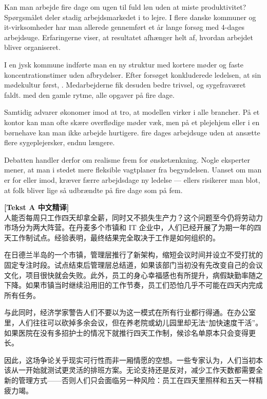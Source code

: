 Kan man arbejde fire dage om ugen til fuld løn uden at miste produktivitet? Spørgsmålet deler stadig arbejdsmarkedet i to lejre. I flere danske kommuner og it-virksomheder har man allerede gennemført et år lange forsøg med 4-dages arbejdsuge. Erfaringerne viser, at resultatet afhænger helt af, hvordan arbejdet bliver organiseret.

I en jysk kommune indførte man en ny struktur med kortere møder og faste koncentrationstimer uden afbrydelser. Efter forsøget konkluderede ledelsen, at  sin mødekultur først, . Medarbejderne fik desuden bedre trivsel, og sygefraværet faldt.  med den gamle rytme,  alle opgaver på fire dage.

Samtidig advarer økonomer imod at tro, at modellen virker i alle brancher. På et kontor kan man ofte skære overflødige møder væk, men på et plejehjem eller i en børnehave kan man ikke arbejde hurtigere.  fire dages arbejdsuge uden at ansætte flere sygeplejersker,  endnu længere.

Debatten handler derfor om realisme frem for ønsketænkning. Nogle eksperter mener, at man i stedet  mere fleksible vagtplaner fra begyndelsen. Uanset om man er for eller imod, kræver færre arbejdsdage ny ledelse --- ellers risikerer man blot, at folk bliver lige så udbrændte på fire dage som på fem.

\begin{transbox}
\small
\textbf{\color{NCDTeal}[Tekst A 中文精译]}\\
人能否每周只工作四天却拿全薪，同时又不损失生产力？这个问题至今仍将劳动力市场分为两大阵营。在丹麦多个市镇和 IT 企业中，人们已经开展了为期一年的四天工作制试点。经验表明，最终结果完全取决于工作是如何组织的。

在日德兰半岛的一个市镇，管理层推行了新架构，缩短会议时间并设立不受打扰的固定专注时段。试点结束后管理层总结道，如果该部门当初没有先改变自己的会议文化，项目很快就会失败。此外，员工的身心幸福感也有所提升，病假缺勤率随之下降。如果市镇当时继续沿用旧的工作节奏，员工们恐怕几乎不可能在四天内完成所有任务。

与此同时，经济学家警告人们不要以为这一模式在所有行业都行得通。在办公室里，人们往往可以砍掉多余会议，但在养老院或幼儿园里却无法“加快速度干活”。如果医院在没有多招护士的情况下就推行四天工作制，候诊名单原本只会变得更长。

因此，这场争论关乎现实可行性而非一厢情愿的空想。一些专家认为，人们当初本该从一开始就测试更灵活的排班方案。无论支持还是反对，减少工作天数都需要全新的管理方式——否则人们只会面临另一种风险：员工在四天里照样和五天一样精疲力竭。
\end{transbox}

